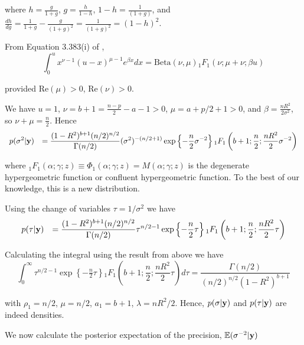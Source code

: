 \documentclass{amsart}[12pt]
\newcommand{\mgc}[1]{{\color{blue}#1}}
\begin{document}

\noindent where
$h = \frac{g}{1+g}$,
$g = \frac{h}{1-h}$,
$1 - h = \frac{1}{(1 + g)}$,
and
$\frac{dh}{dg} = \frac{1}{1+g} - \frac{g}{(1 +g)^2} = \frac{1}{(1+g)^2} = (1 - h)^2$.

\noindent From Equation 3.383(i) of \citep{Gradshteyn1988},
$$
\int_{0}^u x^{\nu - 1} (u - x)^{\mu - 1}  e^{\beta x} dx = \mbox{Beta}(\nu,\mu) {}_1 F_1(\nu;\mu+\nu;\beta u)
$$

\noindent provided $\mbox{Re}(\mu)>0$, $\mbox{Re}(\nu)>0$.

\noindent We have
$u = 1$, $\nu = b + 1 = \frac{n-p}{2} - a - 1 >0$, $\mu = a + p/2 + 1 >0$, and 
$\beta = \frac{nR^2}{2\sigma^2}$, so $\nu + \mu = \frac{n}{2}$. Hence
$$
\begin{array}{rl}
	\displaystyle p(\sigma^2|{\bf y}) 
	  & \displaystyle = \frac{(1 -  R^2)^{b+1} ( n/2)^{n/2}}{\Gamma(n/2)} 
	(\sigma^2)^{-(n/2 + 1)}\exp\left\{ -  \frac{n}{2} \sigma^{-2} \right\}  {}_1 F_1\left(
	b + 1; \frac{n}{2}; \frac{nR^2}{2} \sigma^{-2} \right)
\end{array}
$$

\noindent where ${}_1 F_1(\alpha;\gamma;z) \equiv \Phi_1(\alpha;\gamma;z) = M(\alpha;\gamma;z)$ 
is the
degenerate hypergeometric function or
confluent hypergeometric function. To the best of our knowledge, this is a new distribution.

\noindent Using the change of variables $\tau= 1/\sigma^2$ we have
$$
\begin{array}{rl}
	\displaystyle p(\tau|{\bf y}) 
	  & \displaystyle = \frac{(1 -  R^2)^{b+1} ( n/2)^{n/2}}{\Gamma(n/2)} 
	\tau^{n/2 - 1}\exp\left\{ -  \frac{n}{2} \tau \right\} {}_1 F_1\left(
	b + 1; \frac{n}{2}; \frac{nR^2}{2} \tau \right)
\end{array}
$$

\noindent Calculating the integral using the result from \citep{Gradshteyn1988} above we have
$$
\int_0^\infty \tau^{n/2 - 1}\exp\left\{ -  \tfrac{n}{2} \tau \right\}{}_1 F_1\left(
b + 1; \frac{n}{2}; \frac{nR^2}{2} \tau \right) d \tau = 
\frac{\Gamma(n/2)}{(n/2)^{n/2}\left( 1 - R^2\right)^{b+1}}
$$

\noindent with $\rho_1 = n/2$, $\mu = n/2$, $a_1 = b+1$, $\lambda = nR^2/2$. Hence, $p(\sigma|{\bf y})$ and $p(\tau|{\bf y})$ are indeed densities.


We now calculate the posterior expectation of the precision, ${\mathbb E}(\sigma^{-2}|{\bf y})$
\end{document}
